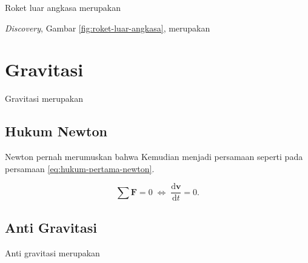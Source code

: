 Roket luar angkasa merupakan \lipsum[1]

\emph{Discovery}, Gambar \ref{fig:roket-luar-angkasa}, merupakan \lipsum[2]

\section{Gravitasi}
\label{sec:gravitasi}

Gravitasi merupakan \lipsum[1]

\subsection{Hukum Newton}
\label{subsec:hukum-newton}

Newton \parencite{newton1687} pernah merumuskan bahwa \lipsum[1]
Kemudian menjadi persamaan seperti pada persamaan \ref{eq:hukum-pertama-newton}.

\begin{equation}
  \label{eq:hukum-pertama-newton}
  \sum \mathbf{F} = 0\; \Leftrightarrow\; \frac{\mathrm{d} \mathbf{v} }{\mathrm{d}t} = 0.
\end{equation}

\subsection{Anti Gravitasi}
\label{subsec:anti-gravitasi}

Anti gravitasi merupakan \lipsum[1]
